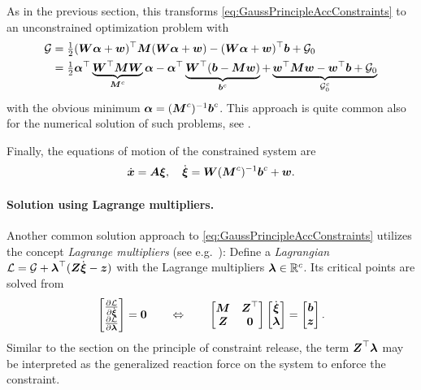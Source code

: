 As in the previous section, this transforms \eqref{eq:GaussPrincipleAccConstraints} to an unconstrained optimization problem with
\begin{align}
 \GaussianConstraint &= \tfrac{1}{2} (\mat{W}\tuple{\alpha} + \tuple{w})^\top \sysInertiaMat (\mat{W}\tuple{\alpha} + \tuple{w}) - (\mat{W}\tuple{\alpha} + \tuple{w})^\top \sysForce + \GaussianConstraint_0
\\
 &= \tfrac{1}{2} \tuple{\alpha}^\top \underbrace{\mat{W}^\top \sysInertiaMat \mat{W}}_{\sysInertiaMat^c} \tuple{\alpha} - \tuple{\alpha}^\top \underbrace{\mat{W}^\top (\sysForce - \sysInertiaMat \tuple{w})}_{\sysForce^c} + \underbrace{\tuple{w}^\top \sysInertiaMat \tuple{w} - \tuple{w}^\top \sysForce + \GaussianConstraint_0}_{\GaussianConstraint_0^c}
\end{align}
with the obvious minimum $\tuple{\alpha} = (\sysInertiaMat^c)^{-1} \sysForce^c$.
This approach is quite common also for the numerical solution of such problems, see \cite{Gould:EqualityConstrainedQuadraticProgramming}.

Finally, the equations of motion of the constrained system are
\begin{align}
 \sysCoordd = \kinMat\sysVel, 
\quad
 \sysVeld = \mat{W}(\sysInertiaMat^c)^{-1} \sysForce^c + \tuple{w}.
\end{align}

\paragraph{Solution using Lagrange multipliers.}
Another common solution approach to \eqref{eq:GaussPrincipleAccConstraints} utilizes the concept \textit{Lagrange multipliers} (see e.g.\ \cite[ch.\,14]{Luenberger:LinearAndNonlinearProgramming}):
Define a \textit{Lagrangian} $\Lagrangian = \GaussianConstraint + \LagrangeMult^\top (\accConstraintMat\sysVeld - \accConstraintB)$ with the Lagrange multipliers $\LagrangeMult \in \RealNum^c$.
Its critical points are solved from
\begin{align}\label{eq:EOMMultipliers}
 \begin{bmatrix} \pdiff[\Lagrangian]{\sysVeld} \\ \pdiff[\Lagrangian]{\LagrangeMult} \end{bmatrix} = \tuple{0}
\qquad\Leftrightarrow\qquad
 \begin{bmatrix} \sysInertiaMat & \accConstraintMat^\top \\ \accConstraintMat & \mat{0} \end{bmatrix}
 \begin{bmatrix} \sysVeld \\ \LagrangeMult \end{bmatrix}
 =
 \begin{bmatrix} \sysForce \\ \accConstraintB \end{bmatrix}.
\end{align}
Similar to the section on the principle of constraint release, the term $\accConstraintMat^\top \LagrangeMult$ may be interpreted as the generalized reaction force on the system to enforce the constraint.


